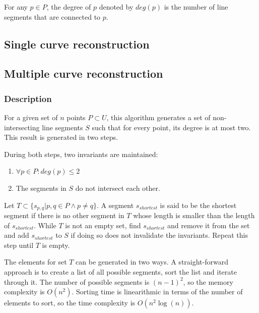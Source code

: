 \documentclass[11pt]{article}
\begin{document}
For any $p \in P$, the degree of $p$ denoted by $deg(p)$ is the number of line segments that are connected to $p$.

\subsection{Single curve reconstruction}

\subsection{Multiple curve reconstruction}
\subsubsection{Description}
For a given set of $n$ points $P \subset U$, this algorithm generates a set of non-intersecting line segments $S$ such that for every point, its degree is at most two. This result is generated in two steps.

During both steps, two invariants are maintained:%
\noindent\begin{enumerate}\topsep=0pt\itemsep=0pt\parsep=0pt
\item $\forall p \in P : deg(p) \leq 2$
\item The segments in $S$ do not intersect each other.
\end{enumerate}


Let $T \subset \{s_{p,q} | p,q \in P \land p \neq q \}$. A segment $s_{shortest}$ is said to be the shortest segment if there is no other segment in $T$ whose length is smaller than the length of $s_{shortest}$.
While $T$ is not an empty set, find $s_{shortest}$ and remove it from the set and add $s_{shortest}$ to $S$ if doing so does not invalidate the invariants. Repeat this step until $T$ is empty.


The elements for set $T$ can be generated in two ways. A straight-forward approach is to create a list of all possible segments, sort the list and iterate through it. The number of possible segments is $(n-1)^2$, so the memory complexity is $O(n^2)$. Sorting time is linearithmic in terms of the number of elements to sort, so the time complexity is $O(n^2\log(n))$.
\end{document}
